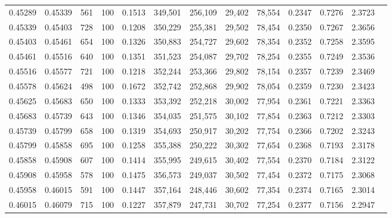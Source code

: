 \begin{tabular}{rrrrrrrrrrrrr}
0.45289 & 0.45339 &   561 & 100 &                                     0.1513 & 349,501 & 256,109 &  29,402 &  78,554 & 0.2347 & 0.7276 & 2.3723 \\
0.45339 & 0.45403 &   728 & 100 &                                     0.1208 & 350,229 & 255,381 &  29,502 &  78,454 & 0.2350 & 0.7267 & 2.3656 \\
0.45403 & 0.45461 &   654 & 100 &                                     0.1326 & 350,883 & 254,727 &  29,602 &  78,354 & 0.2352 & 0.7258 & 2.3595 \\
0.45461 & 0.45516 &   640 & 100 &                                     0.1351 & 351,523 & 254,087 &  29,702 &  78,254 & 0.2355 & 0.7249 & 2.3536 \\
0.45516 & 0.45577 &   721 & 100 &                                     0.1218 & 352,244 & 253,366 &  29,802 &  78,154 & 0.2357 & 0.7239 & 2.3469 \\
0.45578 & 0.45624 &   498 & 100 &                                     0.1672 & 352,742 & 252,868 &  29,902 &  78,054 & 0.2359 & 0.7230 & 2.3423 \\
0.45625 & 0.45683 &   650 & 100 &                                     0.1333 & 353,392 & 252,218 &  30,002 &  77,954 & 0.2361 & 0.7221 & 2.3363 \\
0.45683 & 0.45739 &   643 & 100 &                                     0.1346 & 354,035 & 251,575 &  30,102 &  77,854 & 0.2363 & 0.7212 & 2.3303 \\
0.45739 & 0.45799 &   658 & 100 &                                     0.1319 & 354,693 & 250,917 &  30,202 &  77,754 & 0.2366 & 0.7202 & 2.3243 \\
0.45799 & 0.45858 &   695 & 100 &                                     0.1258 & 355,388 & 250,222 &  30,302 &  77,654 & 0.2368 & 0.7193 & 2.3178 \\
0.45858 & 0.45908 &   607 & 100 &                                     0.1414 & 355,995 & 249,615 &  30,402 &  77,554 & 0.2370 & 0.7184 & 2.3122 \\
0.45908 & 0.45958 &   578 & 100 &                                     0.1475 & 356,573 & 249,037 &  30,502 &  77,454 & 0.2372 & 0.7175 & 2.3068 \\
0.45958 & 0.46015 &   591 & 100 &                                     0.1447 & 357,164 & 248,446 &  30,602 &  77,354 & 0.2374 & 0.7165 & 2.3014 \\
0.46015 & 0.46079 &   715 & 100 &                                     0.1227 & 357,879 & 247,731 &  30,702 &  77,254 & 0.2377 & 0.7156 & 2.2947 \\

\end{tabular}
